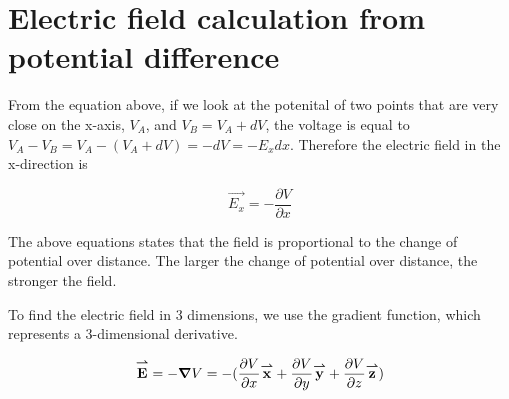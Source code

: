 \documentclass{ximera}
\begin{document}
\section{Electric field calculation from potential difference}

From the equation above, if we look at the potenital of two points that are very close on the x-axis, $V_A$, and $V_B=V_A+dV$, the voltage is equal to $V_A-V_B=V_A-(V_A+dV)=-dV=-E_x dx$. Therefore the electric field in the x-direction is 

\begin{equation}
\vec{E_x}=-\frac{\partial V}{\partial x} 
\end{equation}

The above equations states that the field is proportional to the change of potential over distance. The larger the change of potential over distance, the stronger the field.

To find the electric field in 3 dimensions, we use the gradient function, which represents a 3-dimensional derivative.

\begin{equation}
{\overset{\boldsymbol{\rightharpoonup}}{\mathbf{E}}}\hspace{0in}=-\boldsymbol\nabla V = -(\frac{\partial V}{\partial x}{\overset{\boldsymbol{\rightharpoonup}}{\mathbf{x}}}\hspace{0in}+\frac{\partial V}{\partial y}{\overset{\boldsymbol{\rightharpoonup}}{\mathbf{y}}}\hspace{0in}+\frac{\partial V}{\partial z}{\overset{\boldsymbol{\rightharpoonup}}{\mathbf{z}}}\hspace{0in})
\end{equation}
\end{document}
